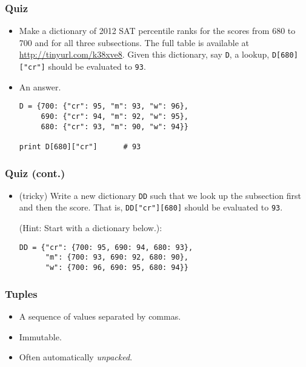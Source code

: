\documentclass{beamer}
\begin{document}
\begin{frame}[fragile]
\frametitle{Quiz}
\begin{itemize}
\item<1-> Make a dictionary of 2012
      SAT percentile ranks for the scores
      from 680 to 700 and for all three subsections.
      The full table is available at 
      \url{http://tinyurl.com/k38xve8}.
      Given this dictionary, say \lstinline{D},
      a lookup, \lstinline{D[680]["cr"]}
      should be evaluated to \lstinline{93}.
\item<2-> An answer.
\begin{lstlisting}
D = {700: {"cr": 95, "m": 93, "w": 96},
     690: {"cr": 94, "m": 92, "w": 95},
     680: {"cr": 93, "m": 90, "w": 94}} 

print D[680]["cr"]      # 93
\end{lstlisting}
\end{itemize}
\end{frame}

\begin{frame}[fragile]
\frametitle{Quiz (cont.)}
\begin{itemize}
\item (tricky) Write a new dictionary \lstinline{DD} such that
     we look up the subsection first and then
     the score. That is,
     \lstinline{DD["cr"][680]} should be
     evaluated to \lstinline{93}.
 
     (Hint: Start with a dictionary below.):
\begin{lstlisting}
DD = {"cr": {700: 95, 690: 94, 680: 93}, 
      "m": {700: 93, 690: 92, 680: 90},
      "w": {700: 96, 690: 95, 680: 94}}
\end{lstlisting} 
\end{itemize}
\end{frame}

\begin{frame}[fragile]
\frametitle{Tuples}
\begin{itemize}
\item A sequence of values separated by commas.
\item Immutable.
\item Often automatically \emph{unpacked}.
\end{itemize}
\end{frame}
\end{document}
